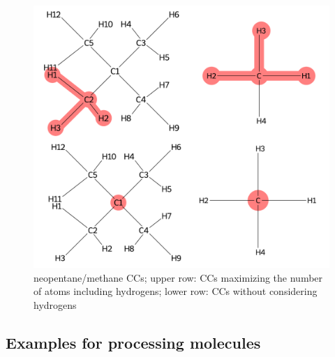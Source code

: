 \begin{figure}
	\includegraphics[scale=0.55]{neopentan_new}
	
	\caption{neopentane/methane CCs; upper row: CCs maximizing the number of atoms including hydrogens; lower row: CCs without considering hydrogens }
		\label{fig:neopentan}
\end{figure}



\subsection{Examples for processing molecules}

